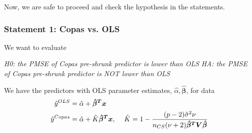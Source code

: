 \documentclass{article}
\begin{document}
Now, we are safe to proceed and check the hypothesis in the statements.


\subsubsection*{Statement 1: Copas vs. OLS}
\hspace{12 pt}  We want to evaluate


\hspace{12 pt} \textit{H0: the PMSE of Copas pre-shrunk predictor is
  lower than OLS} \newline
\vspace{2 pt}
\hspace{24 pt} \textit{HA: the PMSE of Copas pre-shrunk predictor is NOT
  lower than OLS} \newline


We have the predictors with OLS parameter estimates, $\hat{\alpha},
\bm{\hat{\beta}}$, for data
\begin{displaymath}
\begin{split}
\hat{y}^{OLS} &= \hat{\alpha} + \bm{\hat{\beta}^Tx} \\
\hat{y}^{Copas} &= \hat{\alpha} + \hat{K}\bm{\hat{\beta}^Tx},
\hspace{12 pt} \hat{K} = 1 - \frac{(p-2)\hat{\sigma}^2\nu}{n_{CS}(\nu+2)\bm{\hat{\beta}^TV\hat{\beta}}}
\end{split}
\end{displaymath}







\end{document}
